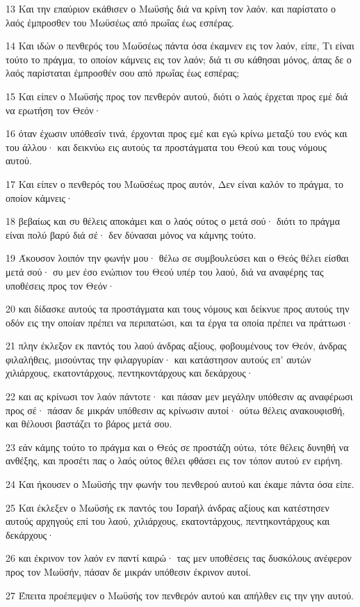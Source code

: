 \par 13 Και την επαύριον εκάθισεν ο Μωϋσής διά να κρίνη τον λαόν. και παρίστατο ο λαός έμπροσθεν του Μωϋσέως από πρωΐας έως εσπέρας.
\par 14 Και ιδών ο πενθερός του Μωϋσέως πάντα όσα έκαμνεν εις τον λαόν, είπε, Τι είναι τούτο το πράγμα, το οποίον κάμνεις εις τον λαόν; διά τι συ κάθησαι μόνος, άπας δε ο λαός παρίσταται έμπροσθέν σου από πρωΐας έως εσπέρας;
\par 15 Και είπεν ο Μωϋσής προς τον πενθερόν αυτού, διότι ο λαός έρχεται προς εμέ διά να ερωτήση τον Θεόν·
\par 16 όταν έχωσιν υπόθεσίν τινά, έρχονται προς εμέ και εγώ κρίνω μεταξύ του ενός και του άλλου· και δεικνύω εις αυτούς τα προστάγματα του Θεού και τους νόμους αυτού.
\par 17 Και είπεν ο πενθερός του Μωϋσέως προς αυτόν, Δεν είναι καλόν το πράγμα, το οποίον κάμνεις·
\par 18 βεβαίως και συ θέλεις αποκάμει και ο λαός ούτος ο μετά σού· διότι το πράγμα είναι πολύ βαρύ διά σέ· δεν δύνασαι μόνος να κάμνης τούτο.
\par 19 Άκουσον λοιπόν την φωνήν μου· θέλω σε συμβουλεύσει και ο Θεός θέλει είσθαι μετά σού· συ μεν έσο ενώπιον του Θεού υπέρ του λαού, διά να αναφέρης τας υποθέσεις προς τον Θεόν·
\par 20 και δίδασκε αυτούς τα προστάγματα και τους νόμους και δείκνυε προς αυτούς την οδόν εις την οποίαν πρέπει να περιπατώσι, και τα έργα τα οποία πρέπει να πράττωσι·
\par 21 πλην έκλεξον εκ παντός του λαού άνδρας αξίους, φοβουμένους τον Θεόν, άνδρας φιλαλήθεις, μισούντας την φιλαργυρίαν· και κατάστησον αυτούς επ' αυτών χιλιάρχους, εκατοντάρχους, πεντηκοντάρχους και δεκάρχους·
\par 22 και ας κρίνωσι τον λαόν πάντοτε· και πάσαν μεν μεγάλην υπόθεσιν ας αναφέρωσι προς σέ· πάσαν δε μικράν υπόθεσιν ας κρίνωσιν αυτοί· ούτω θέλεις ανακουφισθή, και θέλουσι βαστάζει το βάρος μετά σου.
\par 23 εάν κάμης τούτο το πράγμα και ο Θεός σε προστάζη ούτω, τότε θέλεις δυνηθή να ανθέξης, και προσέτι πας ο λαός ούτος θέλει φθάσει εις τον τόπον αυτού εν ειρήνη.
\par 24 Και ήκουσεν ο Μωϋσής την φωνήν του πενθερού αυτού και έκαμε πάντα όσα είπε.
\par 25 Και έκλεξεν ο Μωϋσής εκ παντός του Ισραήλ άνδρας αξίους και κατέστησεν αυτούς αρχηγούς επί του λαού, χιλιάρχους, εκατοντάρχους, πεντηκοντάρχους και δεκάρχους·
\par 26 και έκρινον τον λαόν εν παντί καιρώ· τας μεν υποθέσεις τας δυσκόλους ανέφερον προς τον Μωϋσήν, πάσαν δε μικράν υπόθεσιν έκρινον αυτοί.
\par 27 Έπειτα προέπεμψεν ο Μωϋσής τον πενθερόν αυτού και απήλθεν εις την γην αυτού.

